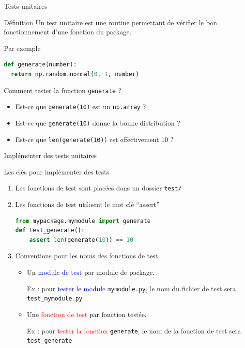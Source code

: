 \documentclass[10pt]{beamer}
\begin{document}
\begin{frame}[fragile]{Tests unitaires}
  
  \begin{block}{Définition}
    \medskip    
    Un test unitaire est une routine permettant de vérifier le bon fonctionnement d'une fonction du package.
  \end{block}

  \begin{exampleblock}{Par exemple}
\begin{lstlisting}[language=python, numbers=none]
def generate(number):
  return np.random.normal(0, 1, number)
\end{lstlisting}
  \end{exampleblock}
  
  Comment tester la function \texttt{generate} ?
  \begin{itemize}
    \item Est-ce que \texttt{generate(10)} est un \texttt{np.array} ?
    \item Est-ce que \texttt{generate(10)} donne la bonne distribution ?
    \item Est-ce que \texttt{len(generate(10))} est effectivement 10 ?
  \end{itemize}
\end{frame}


\begin{frame}[fragile]{Implémenter des tests unitaires}

  \begin{block}{Les clés pour implémenter des tests}
    \medskip

    \begin{enumerate}
      \item<+-> Les fonctions de test sont placées dans un dossier \texttt{test/}
      \item<+->Les fonctions de test utilisent le mot clé ``assert''
\begin{lstlisting}[language=python, numbers=none, morekeywords=assert]
from mypackage.mymodule import generate
def test_generate():
    assert len(generate(10)) == 10
\end{lstlisting}
      \item<+-> Conventions pour les noms des fonctions de test
        \begin{itemize}
          \item<+-> Un \textcolor{blue}{module de test} par module de package.
          
          Ex : pour \textcolor{blue}{tester le module} \texttt{mymodule.py}, le nom du fichier de test sera \texttt{test\_mymodule.py}
          \item<+-> Une \textcolor{red}{fonction de test} par fonction testée. 
          
          Ex : pour \textcolor{red}{tester la fonction} \texttt{generate}, le nom de la fonction de test sera \texttt{test\_generate}
        \end{itemize}
    \end{enumerate}
  \end{block}

\end{frame}
\end{document}
